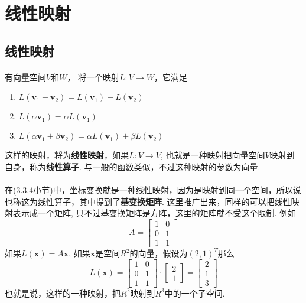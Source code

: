 \section{线性映射}

\subsection{线性映射}
\paragraph{}
有向量空间$V$和$W$， 将一个映射$L: V \to W$，它满足
\begin{enumerate}
\item $L(\textbf{v}_1 + \textbf{v}_2) = L(\textbf{v}_1) + L(\textbf{v}_2)$
\item $L(\alpha \textbf{v}_1) = \alpha L(\textbf{v}_1)$
\item $L(\alpha \textbf{v}_1 + \beta \textbf{v}_2) = \alpha L(\textbf{v}_1) + \beta L(\textbf{v}_2)$
\end{enumerate}
这样的映射，将为\textbf{线性映射}，如果$L: V \to V$, 也就是一种映射把向量空间$V$映射到自身，称为\textbf{线性算子}. 与一般的函数类似，不过这种映射的参数为向量. 

\paragraph{}
在(3.3.4小节)中，坐标变换就是一种线性映射，因为是映射到同一个空间，所以说也称这为线性算子，其中提到了\textbf{基变换矩阵}.  这里推广出来，同样的可以把线性映射表示成一个矩阵, 只不过基变换矩阵是方阵，这里的矩阵就不受这个限制.  例如
$$
A = \begin{bmatrix}
1 & 0 \\
0 & 1 \\
1 & 1 
\end{bmatrix}
$$ 
如果$L(\textbf{x}) = A\textbf{x}$, 如果$\textbf{x}$是空间$R^2$的向量，假设为$(2, 1)^T$那么
$$
L(\textbf{x}) = \begin{bmatrix}
1 & 0 \\
0 & 1 \\
1 & 1 
\end{bmatrix} \cdot \begin{bmatrix}
2 \\
1 
\end{bmatrix} =  \begin{bmatrix}
2 \\
1  \\
3
\end{bmatrix} 
$$
也就是说，这样的一种映射，把$R^2$映射到$R^3$中的一个子空间. 


